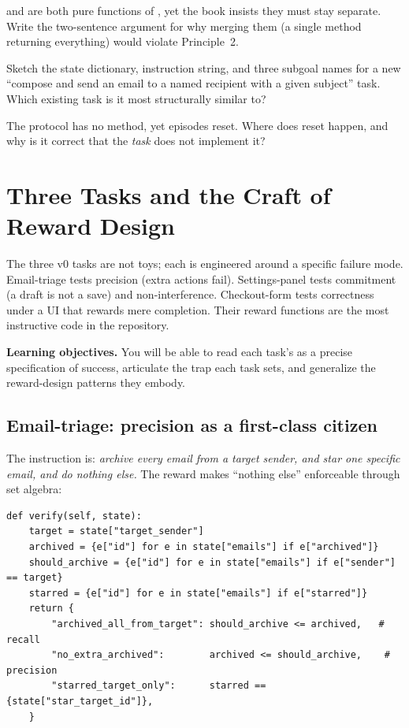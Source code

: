 \documentclass[11pt,openany]{book}
\newcommand{\code}[1]{\textcolor{clayd}{\texttt{\detokenize{#1}}}}
\newcommand{\exhead}{\vspace{0.8em}\needspace{3\baselineskip}%
  \noindent{\large\bfseries\color{clayd}Exercises}\par\nobreak\vspace{0.3em}}
\begin{document}
\exhead
\begin{exercises}
\item \code{view} and \code{verify} are both pure functions of \code{state}, yet
the book insists they must stay separate. Write the two-sentence argument for why
merging them (a single method returning everything) would violate
Principle~2.
\item Sketch the state dictionary, instruction string, and three subgoal names
for a new ``compose and send an email to a named recipient with a given subject''
task. Which existing task is it most structurally similar to?
\item The protocol has no \code{reset} method, yet episodes reset. Where does
reset happen, and why is it correct that the \emph{task} does not implement it?
\end{exercises}

\chapter{Three Tasks and the Craft of Reward Design}
\label{ch:tasks}

\begin{keybox}[.\ ]
The three v0 tasks are not toys; each is engineered around a specific failure
mode. Email-triage tests precision (extra actions fail). Settings-panel tests
commitment (a draft is not a save) and non-interference. Checkout-form tests
correctness under a UI that rewards mere completion. Their reward functions are
the most instructive code in the repository.
\end{keybox}

\textbf{Learning objectives.} You will be able to read each task's \code{verify}
as a precise specification of success, articulate the trap each task sets, and
generalize the reward-design patterns they embody.

\section{Email-triage: precision as a first-class citizen}

The instruction is: \emph{archive every email from a target sender, and star one
specific email, and do nothing else.} The reward makes ``nothing else''
enforceable through set algebra:

\begin{lstlisting}[style=py]
def verify(self, state):
    target = state["target_sender"]
    archived = {e["id"] for e in state["emails"] if e["archived"]}
    should_archive = {e["id"] for e in state["emails"] if e["sender"] == target}
    starred = {e["id"] for e in state["emails"] if e["starred"]}
    return {
        "archived_all_from_target": should_archive <= archived,   # recall
        "no_extra_archived":        archived <= should_archive,    # precision
        "starred_target_only":      starred == {state["star_target_id"]},
    }
\end{lstlisting}
\end{document}
